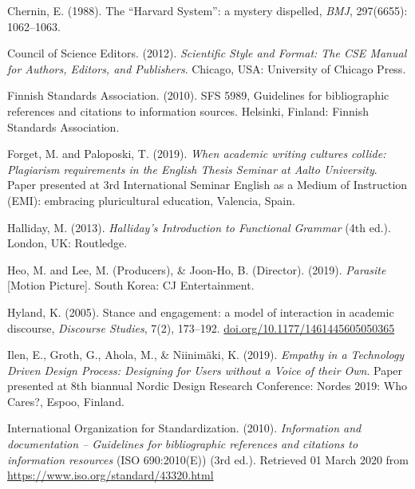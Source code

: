\documentclass[english, 12pt, a4paper, biz, utf8, a-2b, online]{aaltothesis}
\begin{document}
\vspace{1ex}
\noindent
Chernin, E. (1988). 
The “Harvard System”: a mystery dispelled, \textit{BMJ}, 297(6655): 1062--1063.

\vspace{1ex}
\noindent
Council of Science Editors. (2012). 
\textit{Scientific Style and Format: The CSE Manual for Authors, Editors, and
	Publishers}. 
Chicago, USA: University of Chicago Press.

\vspace{1ex}
\noindent
Finnish Standards Association. (2010). SFS 5989, Guidelines for bibliographic 
references and citations to information sources. Helsinki, Finland: Finnish 
Standards Association.

\vspace{1ex}
\noindent
Forget, M. and Paloposki, T. (2019). 
\textit{When academic writing cultures collide: Plagiarism requirements in the 
	English Thesis Seminar at Aalto University}. 
Paper presented at 3rd International Seminar English as a Medium of Instruction 
(EMI): embracing pluricultural education, Valencia, Spain.

\vspace{1ex}
\noindent
Halliday, M. (2013). \textit{Halliday’s Introduction to Functional Grammar} 
(4th ed.). London, UK: Routledge.

\vspace{1ex}
\noindent
Heo, M. and Lee, M. (Producers), \& Joon-Ho, B. (Director). (2019). 
\textit{Parasite} [Motion Picture]. South Korea: CJ Entertainment.

\vspace{1ex}
\noindent
Hyland, K. (2005). 
Stance and engagement: a model of interaction in academic discourse, 
\textit{Discourse Studies}, 7(2), 173--192. 
\url{doi.org/10.1177/1461445605050365}

\vspace{1ex}
\noindent
Ilen, E., Groth, G., Ahola, M., \& Niinimäki, K. (2019). 
\textit{Empathy in a Technology Driven Design Process: Designing for Users 
	without a Voice of their Own}. 
Paper presented at 8th biannual Nordic Design Research Conference: Nordes 2019: 
Who Cares?, Espoo, Finland.

\vspace{1ex}
\noindent
International Organization for Standardization. (2010). 
\textit{Information and documentation -- Guidelines for bibliographic references
	and citations to information resources} 
(ISO 690:2010(E)) (3rd ed.). Retrieved 01 March 2020 from 
\url{https://www.iso.org/standard/43320.html}
\end{document}
